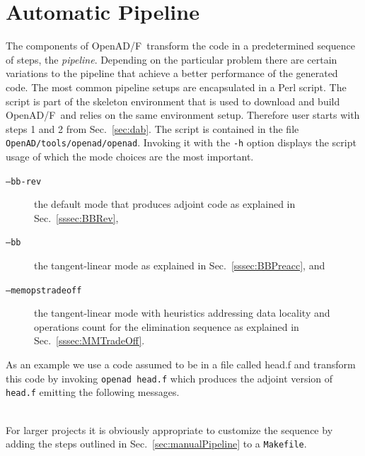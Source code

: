 \documentclass{book}
\newcommand{\OpenADF}{OpenAD/F}
\newcommand{\code}[1]{{\small\tt{#1}}}
\newcommand{\refsec}[1]{{Sec.~\ref{#1}}}
\begin{document}
\section{Automatic Pipeline}
The components of \OpenADF\ transform the code in a predetermined sequence of steps, 
the {\em pipeline}. 
Depending on the particular problem there are certain variations to the pipeline 
that achieve a better performance of the generated code. 
The most common pipeline setups are encapsulated in a Perl script. 
The script is part of the skeleton environment that is used to download and build \OpenADF\  
and relies on the same environment setup.
Therefore user starts with steps 1 and 2 from \refsec{sec:dab}. 
The script is contained in the file
\code{OpenAD/tools/openad/openad}.
Invoking it with the \code{-h} option displays the 
script usage of which the mode choices are the most important.
\begin{description}
\item[\code{--bb-rev}] the default mode that produces adjoint code as explained in \refsec{sssec:BBRev},
\item[\code{--bb}] the tangent-linear mode as explained in \refsec{sssec:BBPreacc}, and
\item[\code{--memopstradeoff}] the tangent-linear mode with heuristics addressing data locality and operations count for the elimination sequence as explained in \refsec{sssec:MMTradeOff}.
\end{description}
As an example we use a code assumed to be in a file called head.f and transform this code 
by invoking \code{openad head.f}
which produces the adjoint version of \code{head.f} emitting the following messages.\\
\hspace*{.05\textwidth}\begin{minipage}{.6\textwidth}
\fontsize{8pt}{9pt}
\end{minipage}\\
For larger projects it is obviously appropriate to customize the sequence 
by adding the steps outlined in \refsec{sec:manualPipeline} to a \code{Makefile}. 
 
\end{document}
